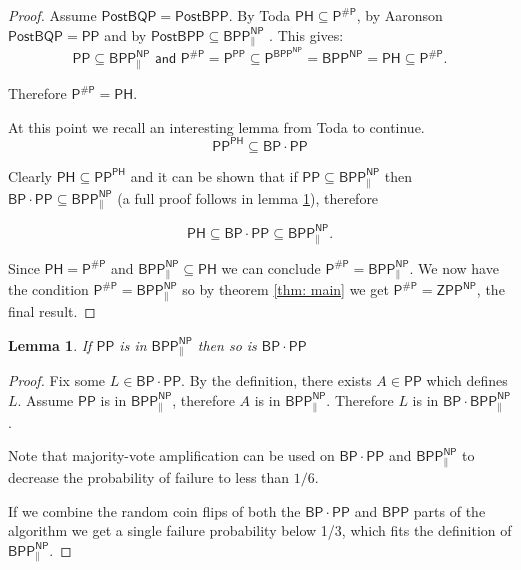 \documentclass{article}
\newtheorem{lemma}[theorem]{Lemma}
\begin{document}
\begin{proof}
Assume $\mathsf{PostBQP=PostBPP}$. By Toda $\mathsf{PH\subseteq P^{\#P}}$, by Aaronson \cite{aaronson2005postBQP} $\mathsf{PostBQP=PP}$ and by $\mathsf{PostBPP \subseteq BPP^{NP}_{\parallel}}$ \cite{o2018weakness, han1997threshold}. This gives: 
\[
\mathsf{
PP \subseteq BPP^{NP}_{\parallel} \text{  and  }  P^{\#P} = P^{PP} \subseteq P^{BPP^{NP}} = BPP^{NP} = PH \subseteq P^{\#P}.
}
\]

Therefore $\mathsf{P^{\#P}=PH}$.

At this point we recall an interesting lemma from Toda \cite{toda1991pp} to continue.
\[\mathsf{
PP^{PH}\subseteq BP\cdot PP
}\]

Clearly $\mathsf{PH\subseteq PP^{PH}}$ and it can be shown that if $\mathsf{PP\subseteq BPP^{NP}_{\parallel}}$ then $\mathsf{BP \cdot PP \subseteq BPP^{NP}_{\parallel}}$ (a full proof follows in lemma \ref{lma: BP PP is in parallel too}), therefore

\[\mathsf{
PH\subseteq BP\cdot PP \subseteq BPP^{NP}_{\parallel}
}.\]

Since $\mathsf{PH = P^{\#P}}$ and $\mathsf{BPP^{NP}_{\parallel}\subseteq PH}$ we can conclude $\mathsf{P^{\#P}=BPP^{NP}_{\parallel}}$. We now have the condition $\mathsf{P^{\#P}= BPP^{NP}_{\parallel}}$ so by theorem \ref{thm: main} we get $\mathsf{P^{\#P} = ZPP^{NP}}$, the final result.
\end{proof}


\begin{lemma}\label{lma: BP PP is in parallel too}
    If $\mathsf{PP}$ is in $\mathsf{BPP^{NP}_{\parallel}}$ then so is $\mathsf{BP \cdot PP}$
\end{lemma}
\begin{proof}
Fix some $L\in \mathsf{BP\cdot PP}$. By the definition, there exists $A\in\mathsf{PP}$ which defines $L$.
Assume $\mathsf{PP}$ is in $\mathsf{BPP^{NP}_{\parallel}}$, therefore $A$ is in $\mathsf{BPP^{NP}_{\parallel}}$. Therefore $L$ is in $\mathsf{BP\cdot BPP^{NP}_{\parallel}}$.

Note that majority-vote amplification can be used on $\mathsf{BP\cdot PP}$ and $\mathsf{BPP^{NP}_{\parallel}}$ to decrease the probability of failure to less than $1/6$.

If we combine the random coin flips of both the $\mathsf{BP \cdot PP}$ and $\mathsf{BPP}$ parts of the algorithm we get a single failure probability below 1/3, which fits the definition of $\mathsf{BPP^{NP}_{\parallel}}$.
\end{proof}
\end{document}
